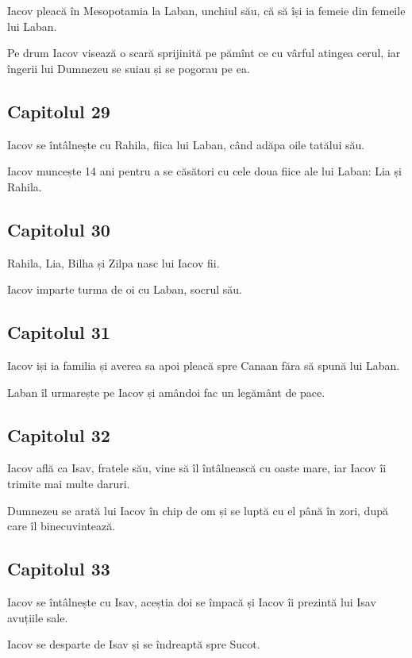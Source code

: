\documentclass[12pt,a4paper]{article}
\begin{document}
Iacov pleacă în Mesopotamia la Laban, unchiul său,
că să își ia femeie din femeile lui Laban.

Pe drum Iacov visează o scară sprijinită pe pămînt ce cu vârful atingea cerul,
iar îngerii lui Dumnezeu se suiau și se pogorau pe ea.

\subsection{Capitolul 29}

Iacov se întâlnește cu Rahila, fiica lui Laban, când adăpa oile tatălui său.

Iacov muncește 14 ani pentru a se căsători cu cele doua fiice ale lui Laban: Lia și Rahila.

\subsection{Capitolul 30}

Rahila, Lia, Bilha și Zilpa nasc lui Iacov fii.

Iacov imparte turma de oi cu Laban, socrul său.

\subsection{Capitolul 31}

Iacov iși ia familia și averea sa apoi pleacă spre Canaan făra să spună lui Laban.

Laban îl urmarește pe Iacov și amândoi fac un legământ de pace.


\subsection{Capitolul 32}

Iacov află ca Isav, fratele său, vine să îl întâlnească cu oaste mare, iar Iacov îi trimite mai multe daruri.

Dumnezeu se arată lui Iacov în chip de om și se luptă cu el până în zori, după care îl binecuvintează.

\subsection{Capitolul 33}

Iacov se întâlnește cu Isav, aceștia doi se împacă și Iacov îi prezintă lui Isav avuțiile sale.

Iacov se desparte de Isav și se îndreaptă spre Sucot.
\end{document}
